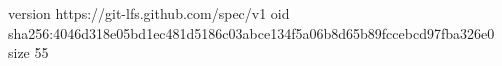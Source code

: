 version https://git-lfs.github.com/spec/v1
oid sha256:4046d318e05bd1ec481d5186c03abce134f5a06b8d65b89fccebcd97fba326e0
size 55
